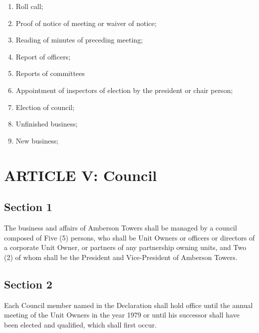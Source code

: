 \documentclass[
]{book}
\providecommand{\tightlist}{%
  \setlength{\itemsep}{0pt}\setlength{\parskip}{0pt}}
\begin{document}
\begin{enumerate}
\def\labelenumi{(\alph{enumi})}
\tightlist
\item
  Roll call;\\
\item
  Proof of notice of meeting or waiver of notice;\\
\item
  Reading of minutes of preceding meeting;\\
\item
  Report of officers;\\
\item
  Reports of committees\\
\item
  Appointment of inspectors of election by the president or chair person;\\
\item
  Election of council;\\
\item
  Unfinished business;\\
\item
  New business;
\end{enumerate}

\hypertarget{article-v-council}{%
\section*{ARTICLE V: Council}\label{article-v-council}}

\hypertarget{section-1-4}{%
\subsection*{Section 1}\label{section-1-4}}

The business and affairs of Amberson Towers shall be managed by a council composed of Five (5) persons, who shall be Unit Owners or officers or directors of a corporate Unit Owner, or partners of any partnership owning units, and Two (2) of whom shall be the President and Vice-President of Amberson Towers.

\hypertarget{section-2-4}{%
\subsection*{Section 2}\label{section-2-4}}

Each Council member named in the Declaration shall hold office until the annual meeting of the Unit Owners in the year 1979 or until his successor shall have been elected and qualified, which shall first occur.
\end{document}
